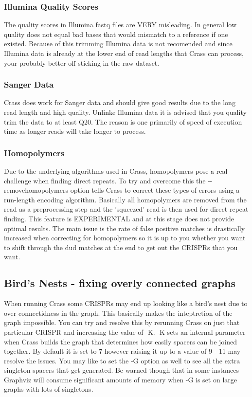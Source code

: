 \documentclass[11pt]{article} %
\begin{document}
\subsubsection{Illumina Quality Scores}
The quality scores in Illumina fastq files are VERY misleading.  In general low quality does not equal bad bases that would mismatch to a reference if one existed.  Because of this trimming Illumina data is not recomended and since Illumina data is already at the lower end of read lengths that Crass can process, your probably better off sticking in the raw dataset.
\subsubsection{Sanger Data}
Crass does work for Sanger data and should give good results due to the long read length and high quality.  Unlinke Illumina data it is advised that you quality trim the data to at least Q20.  The reason is one primarily of speed of execution time as longer reads will take longer to process.
\subsubsection{Homopolymers}
Due to the underlying algorithms used in Crass, homopolymers pose a real challenge when finding direct repeats.  To try and overcome this the -{}-removehomopolymers option tells Crass to correct these types of errors using a run-length encoding algorithm.  Basically all homopolymers are removed from the read as a preprocessing step and the 'squeezed' read is then used for direct repeat finding.  This feature is EXPERIMENTAL and at this stage does not provide optimal results.  The main issue is the rate of false positive matches is drastically increased when correcting for homopolymers so it is up to you whether you want to shift through the dud matches at the end to get out the CRISPRs that you want.  
\subsection{Bird's Nests - fixing overly connected graphs}
When running Crass some CRISPRs may end up looking like a bird's nest due to over connectidness in the graph.  This basically makes the inteptretion of the graph impossible.  You can try and resolve this by rerunning Crass on just that particular CRISPR and increasing the value of -K.  -K sets an internal parameter when Crass builds the graph that determines how easily spacers can be joined together.  By default it is set to 7 however raising it up to a value of 9 - 11 may resolve the issues.  You may like to set the -G option as well to see all the extra singleton spacers that get generated.  Be warned though that in some instances Graphviz will consume significant amounts of memory when -G is set on large graphs with lots of singletons.
\end{document}
